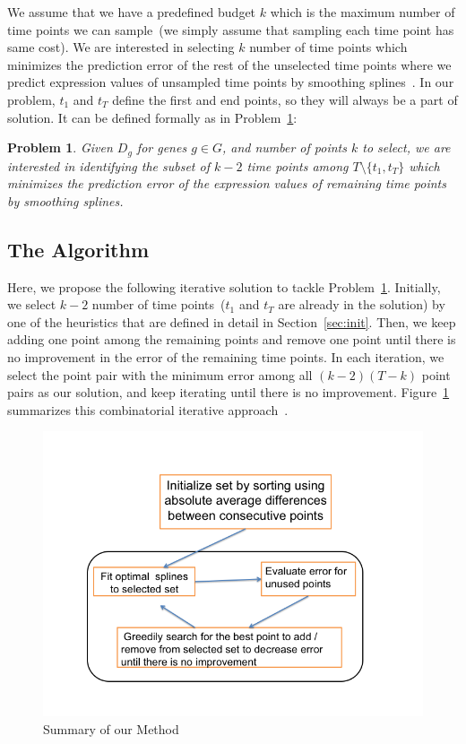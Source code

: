 \documentclass[10pt]{article}
\newtheorem{problem}{Problem}
\begin{document}
We assume that we have a predefined budget $k$ which is the
maximum number of time points we can sample~(we simply
assume that sampling each time point has same cost). We are interested
in selecting $k$ number of time points which minimizes the prediction error
of the rest of the unselected time points where we predict
expression values of unsampled time points by smoothing
splines~\cite{deboor, bar2003, wahba1990}. In
our problem, $t_{1}$ and $t_{T}$ define the first and end points, so
they will always be a part of solution. It can be defined
formally as in Problem~\ref{prob:prob1}:
%
\begin{problem}\label{prob:prob1}
Given $D_{g}$ for genes $g \in G$, and number of points $k$ to select,
we are interested in identifying the subset of $k-2$ time points among
$T \setminus \{t_{1}, t_{T}\}$ which minimizes the prediction error of the expression values of remaining time points by
smoothing splines.
\end{problem}

\subsection{The Algorithm}

Here, we propose the following iterative solution to tackle
Problem~\ref{prob:prob1}. Initially, we select $k-2$ number of time
points~($t_{1}$ and $t_{T}$ are already in the solution) by one of the
heuristics that are defined in detail in Section~\ref{sec:init}. Then,
we keep adding one point among the remaining points 
and remove one point until there is no improvement in the error
of the remaining time points. In each iteration, we select the
point pair with the minimum error among all $(k-2)(T-k)$ point
pairs as our solution, and keep iterating until there is no
improvement. Figure~\ref{fig:algo} summarizes this combinatorial iterative approach~\cite{combinatorial}.

\begin{figure}
\centering
\includegraphics[scale=0.4]{algo.png}
\caption{Summary of our Method}
\label{fig:algo}
\end{figure}
\end{document}
